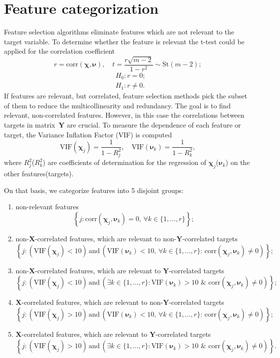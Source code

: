 \documentclass[12pt,twoside]{article}
\theoremstyle{definition}
\newcommand{\bY}{\mathbf{Y}}
\newcommand{\bX}{\mathbf{X}}
\newcommand{\bchi}{\boldsymbol{\chi}}
\newcommand{\bnu}{\boldsymbol{\nu}}
\begin{document}
\section{Feature categorization}
Feature selection algorithms eliminate features which are not relevant to the target variable.
To determine whether the feature is relevant the t-test could be applied for the correlation coefficient
\[
	r = \text{corr} (\bchi, \bnu), \quad t = \frac{r \sqrt{m - 2}}{1 - r^2} \sim \text{St} (m - 2);
\]
\begin{align*}
&H_0: r = 0; \\
&H_1: r \neq 0.
\end{align*}
If features are relevant, but correlated, feature selection methods pick the subset of them to reduce the multicollinearity and redundancy.
The goal is to find relevant, non-correlated features.
However, in this case the correlations between targets in matrix~$\bY$ are crucial.
To measure the dependence of each feature or target, the Variance Inflation Factor (VIF) is computed
\[
	\text{VIF}(\bchi_j) = \frac{1}{1 - R_j^2}, \quad \text{VIF}(\bnu_k) = \frac{1}{1 - R_k^2},
\]
where $R_j^2$($R_k^2$) are coefficients of determination for the regression of $\bchi_j$($\bnu_k$) on the other features(targets).

On that basis, we categorize features into 5 disjoint groups:
\begin{enumerate}
	\item non-relevant features
	\[
		\left\{j: \text{corr}(\bchi_j, \bnu_k) = 0, \, \forall k \in \{1, \dots, r\}\right\};
	\]
	\item non-$\bX$-correlated features, which are relevant to non-$\bY$-correlated targets
	\[
		\left\{j: \left(\text{VIF}(\bchi_j) < 10\right) \, \text{and} \, \left(\text{VIF}(\bnu_k) < 10 , \, \forall k \in \{1, \dots, r\}: \,  \text{corr}(\bchi_j, \bnu_k) \neq 0 \right)\right\};
	\]
	\item non-$\bX$-correlated features, which are relevant to $\bY$-correlated targets
	\[
		\left\{j: \left(\text{VIF}(\bchi_j) < 10\right) \, \text{and} \, \left( \exists k \in \{1, \dots, r\}: \text{VIF}(\bnu_k) > 10 \,\, \& \,\, \text{corr}(\bchi_j, \bnu_k) \neq 0 \right)\right\};
	\]
	\item $\bX$-correlated features, which are relevant to non-$\bY$-correlated targets
	\[
		\left\{j: \left(\text{VIF}(\bchi_j) > 10\right) \, \text{and} \, \left(\text{VIF}(\bnu_k) < 10 , \, \forall k \in \{1, \dots, r\}: \,  \text{corr}(\bchi_j, \bnu_k) \neq 0 \right)\right\};
	\]
	\item $\bX$-correlated features, which are relevant to $\bY$-correlated targets
	\[
		\left\{j: \left(\text{VIF}(\bchi_j) > 10\right) \, \text{and} \, \left( \exists k \in \{1, \dots, r\}: \text{VIF}(\bnu_k) > 10 \,\, \& \,\, \text{corr}(\bchi_j, \bnu_k) \neq 0 \right)\right\}.
	\]
\end{enumerate}
\end{document}
